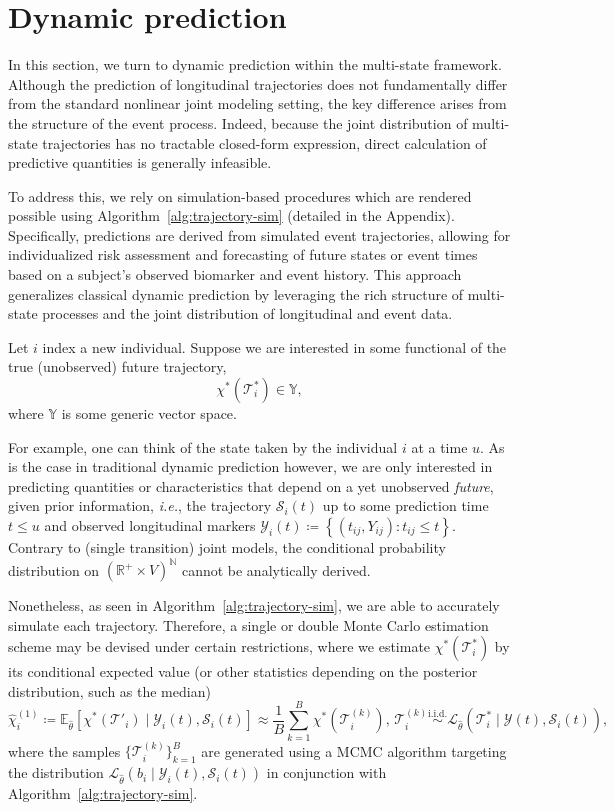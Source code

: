 \documentclass{sn-jnl}
\begin{document}
\section{Dynamic prediction} \label{sec:prediction}

In this section, we turn to dynamic prediction within the multi-state framework. Although the prediction of longitudinal trajectories does not fundamentally differ from the standard nonlinear joint modeling setting, the key difference arises from the structure of the event process. Indeed, because the joint distribution of multi-state trajectories has no tractable closed-form expression, direct calculation of predictive quantities is generally infeasible.

To address this, we rely on simulation-based procedures which are rendered possible using Algorithm~\ref{alg:trajectory-sim} (detailed in the Appendix). Specifically, predictions are derived from simulated event trajectories, allowing for individualized risk assessment and forecasting of future states or event times based on a subject's observed biomarker and event history. This approach generalizes classical dynamic prediction by leveraging the rich structure of multi-state processes and the joint distribution of longitudinal and event data.

\bigbreak

Let $i$ index a new individual. Suppose we are interested in some functional of the true (unobserved) future trajectory,
\[
    \chi^*(\mathcal{T}_i^*) \in \mathbb{Y},
\]
where $\mathbb{Y}$ is some generic vector space. 

For example, one can think of the state taken by the individual $i$ at a time $u$. As is the case in traditional dynamic prediction however, we are only interested in predicting quantities or characteristics that depend on a yet unobserved \emph{future}, given prior information, \textit{i.e.}, the trajectory $\mathcal{S}_i(t)$ up to some prediction time $t \leq u$ and observed longitudinal markers $\mathcal{Y}_i(t) \coloneqq \left\{ (t_{ij}, Y_{ij}) : t_{ij} \leq t \right\}$. Contrary to (single transition) joint models, the conditional probability distribution on $(\mathbb{R}^+ \times V)^\mathbb{N}$ cannot be analytically derived.

Nonetheless, as seen in Algorithm~\ref{alg:trajectory-sim}, we are able to accurately simulate each trajectory. Therefore, a single or double Monte Carlo estimation scheme may be devised under certain restrictions, where we estimate $\chi^*(\mathcal{T}_i^*)$ by its conditional expected value (or other statistics depending on the posterior distribution, such as the median)
\[
    \hat{\chi}_i^{(1)} \coloneqq \mathbb{E}_{\hat{\theta}} \left[ \chi^*(\mathcal{T}'_i) \mid \mathcal{Y}_i(t), \mathcal{S}_i(t) \right] \approx \frac{1}{B} \sum_{k=1}^B \chi^*(\mathcal{T}_i^{(k)}), \, \mathcal{T}_i^{(k)} \overset{\mathrm{i.i.d.}}{\sim} \mathscr{L}_{\hat{\theta}}\left( \mathcal{T}_i^* \mid \mathcal{Y}(t), \mathcal{S}_i(t) \right),
\]
where the samples $\{ \mathcal{T}_i^{(k)} \}_{k = 1}^B$ are generated using a MCMC algorithm targeting the distribution $\mathscr{L}_{\hat{\theta}}\left( b_i \mid \mathcal{Y}_i(t), \mathcal{S}_i(t) \right)$ in conjunction with Algorithm~\ref{alg:trajectory-sim}.
\end{document}
